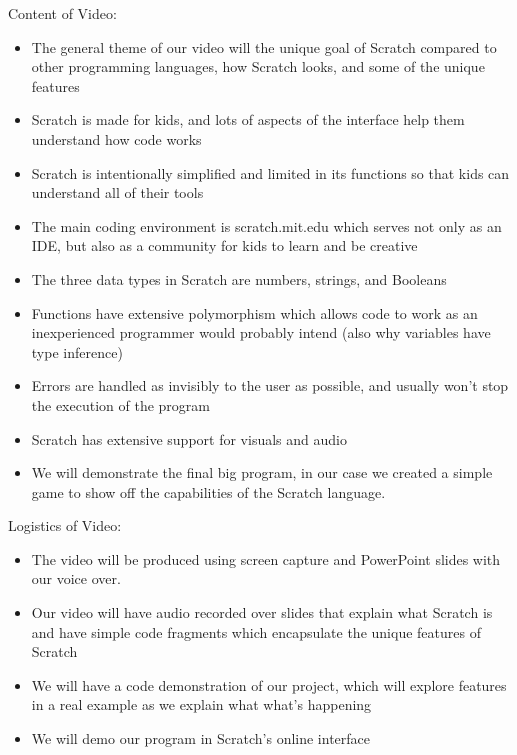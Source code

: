 Content of Video:
\begin{itemize}
    \item The general theme of our video will the unique goal of Scratch compared to other programming languages, how Scratch looks, and some of the unique features 
    \item Scratch is made for kids, and lots of aspects of the interface help them understand how code works
    \item Scratch is intentionally simplified and limited in its functions so that kids can understand all of their tools
    \item The main coding environment is scratch.mit.edu which serves not only as an IDE, but also as a community for kids to learn and be creative
    \item The three data types in Scratch are numbers, strings, and Booleans
    \item Functions have extensive polymorphism which allows code to work as an inexperienced programmer would probably intend (also why variables have type inference)
    \item Errors are handled as invisibly to the user as possible, and usually won't stop the execution of the program
    \item Scratch has extensive support for visuals and audio
    \item We will demonstrate the final big program, in our case we created a simple game to show off the capabilities of the Scratch language.  
\end{itemize}

Logistics of Video:
\begin{itemize}
    \item The video will be produced using screen capture and PowerPoint slides with our voice over.
    \item Our video will have audio recorded over slides that explain what Scratch is and have simple code fragments which encapsulate the unique features of Scratch
    \item We will have a code demonstration of our project, which will explore features in a real example as we explain what what's happening
    \item We will demo our program in Scratch's online interface
\end{itemize}